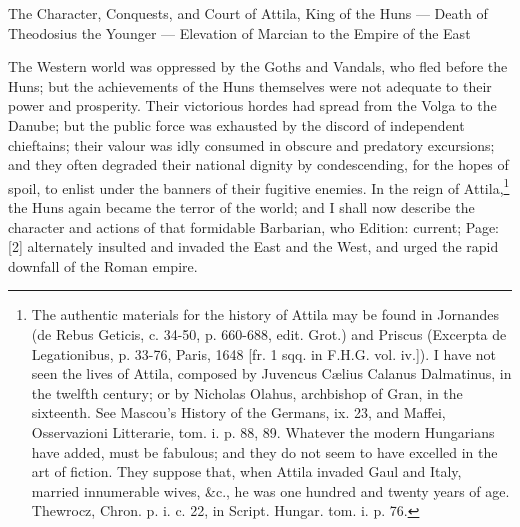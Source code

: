 

The Character, Conquests, and Court of Attila, King of the Huns \texthebrew{—} Death of Theodosius the Younger \texthebrew{—} Elevation of Marcian to the Empire of the East

The Western world was oppressed by the Goths and Vandals, who fled before the Huns; but the achievements of the Huns themselves were not adequate to their power and prosperity. Their victorious hordes had spread from the Volga to the Danube; but the public force was exhausted by the discord of independent chieftains; their valour was idly consumed in obscure and predatory excursions; and they often degraded their national dignity by condescending, for the hopes of spoil, to enlist under the banners of their fugitive enemies. In the reign of Attila,\footnote{The authentic materials for the history of Attila may be found in Jornandes (de Rebus Geticis, c. 34-50, p. 660-688, edit. Grot.) and Priscus (Excerpta de Legationibus, p. 33-76, Paris, 1648 [fr. 1 sqq. in F.H.G. vol. iv.]). I have not seen the lives of Attila, composed by Juvencus Cælius Calanus Dalmatinus, in the twelfth century; or by Nicholas Olahus, archbishop of Gran, in the sixteenth. See Mascou\texthebrew{}’s History of the Germans, ix. 23, and Maffei, Osservazioni Litterarie, tom. i. p. 88, 89. Whatever the modern Hungarians have added, must be fabulous; and they do not seem to have excelled in the art of fiction. They suppose that, when Attila invaded Gaul and Italy, married innumerable wives, \&c., he was one hundred and twenty years of age. Thewrocz, Chron. p. i. c. 22, in Script. Hungar. tom. i. p. 76.} the Huns again became the terror of the world; and I shall now describe the character and actions of that formidable Barbarian, who Edition: current; Page: [2] alternately insulted and invaded the East and the West, and urged the rapid downfall of the Roman empire.

